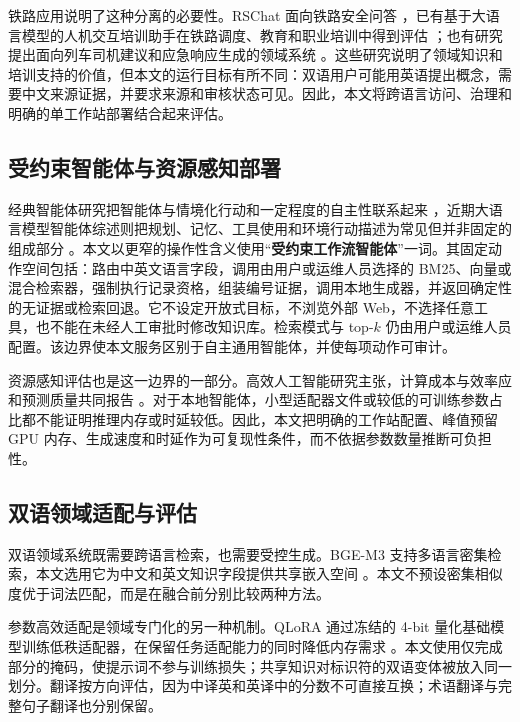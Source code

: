 铁路应用说明了这种分离的必要性。RSChat 面向铁路安全问答 \citep{li2024rschat}，已有基于大语言模型的人机交互培训助手在铁路调度、教育和职业培训中得到评估 \citep{li2025training}；也有研究提出面向列车司机建议和应急响应生成的领域系统 \citep{luo2025driver,huang2026emergency}。这些研究说明了领域知识和培训支持的价值，但本文的运行目标有所不同：双语用户可能用英语提出概念，需要中文来源证据，并要求来源和审核状态可见。因此，本文将跨语言访问、治理和明确的单工作站部署结合起来评估。

\subsection{受约束智能体与资源感知部署}

经典智能体研究把智能体与情境化行动和一定程度的自主性联系起来 \citep{wooldridge1995agents}，近期大语言模型智能体综述则把规划、记忆、工具使用和环境行动描述为常见但并非固定的组成部分 \citep{xi2025agents}。本文以更窄的操作性含义使用“\textbf{受约束工作流智能体}”一词。其固定动作空间包括：路由中英文语言字段，调用由用户或运维人员选择的 BM25、向量或混合检索器，强制执行记录资格，组装编号证据，调用本地生成器，并返回确定性的无证据或检索回退。它不设定开放式目标，不浏览外部 Web，不选择任意工具，也不能在未经人工审批时修改知识库。检索模式与 top-$k$ 仍由用户或运维人员配置。该边界使本文服务区别于自主通用智能体，并使每项动作可审计。

资源感知评估也是这一边界的一部分。高效人工智能研究主张，计算成本与效率应和预测质量共同报告 \citep{schwartz2020green}。对于本地智能体，小型适配器文件或较低的可训练参数占比都不能证明推理内存或时延较低。因此，本文把明确的工作站配置、峰值预留 GPU 内存、生成速度和时延作为可复现性条件，而不依据参数数量推断可负担性。

\subsection{双语领域适配与评估}

双语领域系统既需要跨语言检索，也需要受控生成。BGE-M3 支持多语言密集检索，本文选用它为中文和英文知识字段提供共享嵌入空间 \citep{chen2024bgem3}。本文不预设密集相似度优于词法匹配，而是在融合前分别比较两种方法。

参数高效适配是领域专门化的另一种机制。QLoRA 通过冻结的 4-bit 量化基础模型训练低秩适配器，在保留任务适配能力的同时降低内存需求 \citep{dettmers2023qlora}。本文使用仅完成部分的掩码，使提示词不参与训练损失；共享知识对标识符的双语变体被放入同一划分。翻译按方向评估，因为中译英和英译中的分数不可直接互换；术语翻译与完整句子翻译也分别保留。

